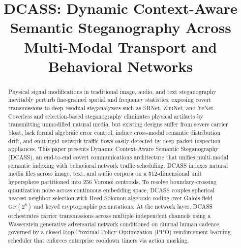 \documentclass[conference]{IEEEtran}
\begin{document}
\title{DCASS: Dynamic Context-Aware Semantic Steganography Across Multi-Modal Transport and Behavioral Networks}

\author{
}

\maketitle

\begin{abstract}
Physical signal modifications in traditional image, audio, and text steganography inevitably perturb fine-grained spatial and frequency statistics, exposing covert transmissions to deep residual steganalyzers such as SRNet, ZhuNet, and YeNet. Coverless and selection-based steganography eliminates physical artifacts by transmitting unmodified natural media, but existing designs suffer from severe carrier bloat, lack formal algebraic error control, induce cross-modal semantic distribution drift, and emit rigid network traffic flows easily detected by deep packet inspection appliances. This paper presents Dynamic Context-Aware Semantic Steganography (DCASS), an end-to-end covert communications architecture that unifies multi-modal semantic indexing with behavioral network traffic scheduling. DCASS indexes natural media files across image, text, and audio corpora on a 512-dimensional unit hypersphere partitioned into 256 Voronoi centroids. To resolve boundary-crossing quantization noise across continuous embedding space, DCASS couples spherical nearest-neighbor selection with Reed-Solomon algebraic coding over Galois field $\text{GF}(2^8)$ and keyed cryptographic permutations. At the network layer, DCASS orchestrates carrier transmissions across multiple independent channels using a Wasserstein generative adversarial network conditioned on diurnal human cadence, governed by a closed-loop Proximal Policy Optimization (PPO) reinforcement learning scheduler that enforces enterprise cooldown timers via action masking.


\end{abstract}
\end{document}
